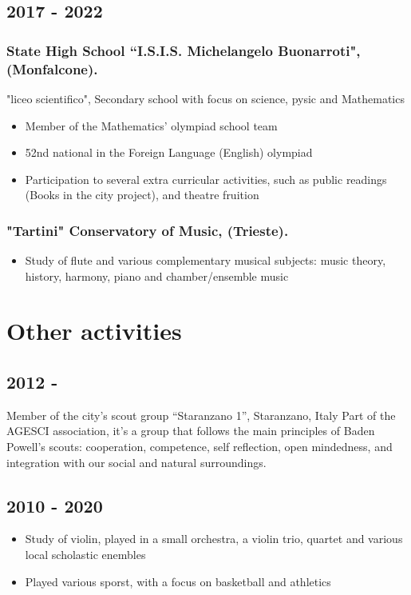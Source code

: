 \documentclass[12pt]{article}
\begin{document}
\subsection{2017 - 2022}
\subsubsection{State High School ``I.S.I.S. Michelangelo Buonarroti", (Monfalcone).}
"liceo scientifico", Secondary school with focus on science, pysic and Mathematics
\begin{itemize}
	\item{Member of the Mathematics' olympiad school team}
	\item{52nd national in the Foreign Language (English) olympiad}
	\item{Participation to several extra curricular activities, such as public readings (Books in the city project), and theatre fruition}
\end{itemize}
\subsubsection{"Tartini" Conservatory of Music, (Trieste).}
\begin{itemize}
	\item{Study of flute and various complementary musical subjects: music theory, history, harmony, piano and chamber/ensemble music}
\end{itemize}
\section{Other activities}
	\subsection{2012 -}
	Member of the city’s scout group “Staranzano 1”, Staranzano, Italy
Part of the AGESCI association, it's a group that follows the main principles of Baden Powell's scouts: cooperation, competence, self reflection, open mindedness, and integration with our social and natural surroundings.
    \subsection{2010 - 2020}
	    \begin{itemize}
			\item{Study of violin, played in a small orchestra, a violin trio, quartet and  various local scholastic enembles}
			\item{Played various sporst, with a focus on basketball and athletics}
		\end{itemize}
\end{document}

